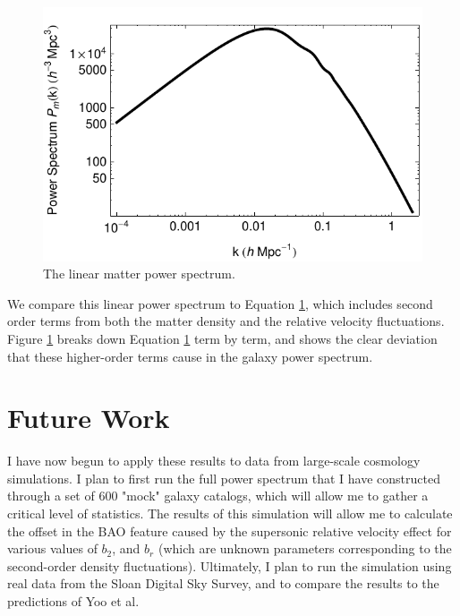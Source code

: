 \documentclass[12pt]{article}
\begin{document}
\begin{figure}[h]
	\centering
	\includegraphics[width=12cm]{Pm}
	\caption{The linear matter power spectrum.}
	\label{Pm}
\end{figure}

We compare this linear power spectrum to Equation \ref{}, which includes second order terms from both the matter density and the relative velocity fluctuations. Figure \ref{} breaks down Equation \ref{} term by term, and shows the clear deviation that these higher-order terms cause in the galaxy power spectrum. 

\section{Future Work}

I have now begun to apply these results to data from large-scale cosmology simulations. I plan to first run the full power spectrum that I have constructed through a set of 600 "mock" galaxy catalogs, which will allow me to gather a critical level of statistics. The results of this simulation will allow me to calculate the offset in the BAO feature caused by the supersonic relative velocity effect for various values of $b_{2}$, and $b_{r}$ (which are unknown parameters corresponding to the second-order density fluctuations). Ultimately, I plan to run the simulation using real data from the Sloan Digital Sky Survey, and to compare the results to the predictions of Yoo et al.
\end{document}
